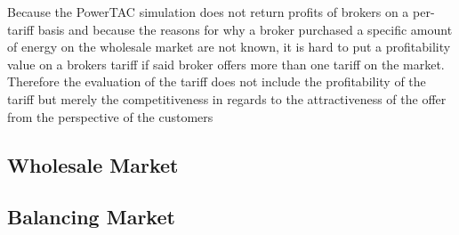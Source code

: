 Because the \ac {PowerTAC} simulation does not return profits of brokers on a per-tariff basis and because the reasons
for why a broker purchased a specific amount of energy on the wholesale market are not known, it is hard to put a
profitability value on a brokers tariff if said broker offers more than one tariff on the market. Therefore the
evaluation of the tariff does not include the profitability of the tariff but merely the competitiveness in regards to
the attractiveness of the offer from the perspective of the customers
%
%

\subsection{Wholesale Market}
\subsection{Balancing Market}
